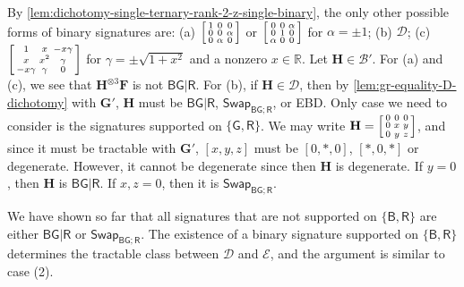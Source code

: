 \documentclass[11pt]{article}
\newcommand{\db}{\mathsf{B}}
\newcommand{\dg}{\mathsf{G}}
\newcommand{\dr}{\mathsf{R}}
\newcommand{\swhelper}[1]{$\mathsf{Swap}_{#1}$\xspace}
\newcommand{\swbg}{\swhelper{\db \dg; \dr}}
\newcommand{\teh}{^{\otimes 3}}
\newcommand{\strspt}{\textsf{EBD}\xspace}
\newcommand{\tractBGR}{$\mathscr{D}$\xspace}
\newcommand{\tractBGGRBR}{$\mathscr{E}$\xspace}
\begin{document}
\begin{enumerate}
    By \cref{lem:dichotomy-single-ternary-rank-2-z-single-binary}, the only other possible forms of binary signatures are: 
    (a) $\begin{bsmallmatrix}
      1 & 0 & 0 \\
      0 & 0 & \alpha \\
      0 & \alpha & 0
      \end{bsmallmatrix}$ or $\begin{bsmallmatrix}
      0 & 0 & \alpha \\
      0 & 1 & 0 \\
      \alpha & 0 & 0
    \end{bsmallmatrix}$ for $\alpha = \pm 1$;
    (b) $\mathcal{D}$;
    (c) $\begin{bsmallmatrix}
      1 & x & -x \gamma \\
      x & x^2 & \gamma \\
      - x \gamma & \gamma & 0
    \end{bsmallmatrix}$ for $\gamma = \pm \sqrt{1 + x^2}$ and a nonzero $x \in \mathbb{R}$.
    Let $\mathbf{H} \in \mathcal{B}'$.
    For (a) and (c),  we see that $\mathbf{H}\teh \mathbf{F}$ is not $\db \dg | \dr$.
    For (b), if $\mathbf{H} \in \mathcal{D}$, then by \cref{lem:gr-equality-D-dichotomy} with $\mathbf{G}'$, $\mathbf{H}$ must be $\db \dg | \dr$, \swbg, or \strspt.
    Only case we need to consider is the signatures supported on $\{\dg, \dr\}$.
    We may write $\mathbf{H} = \begin{bsmallmatrix}
      0 & 0 & 0 \\
      0 & x & y \\
      0 & y & z
    \end{bsmallmatrix}$, and since it must be tractable with $\mathbf{G}'$, $[x, y, z]$ must be $[0, *, 0]$, $[*, 0, *]$ or degenerate.
    However, it cannot be degenerate since then $\mathbf{H}$ is degenerate.
    If $y = 0$, then $\mathbf{H}$ is $\db \dg | \dr$.
    If $x, z = 0$, then it is \swbg.

    We have shown so far that all signatures that are not supported on $\{\db, \dr\}$ are either $\db \dg | \dr$ or \swbg. 
    The existence of a binary signature supported on $\{\db, \dr\}$ determines the tractable class between \tractBGR and \tractBGGRBR, and the argument is similar to case (2).
\end{enumerate}
\end{document}
